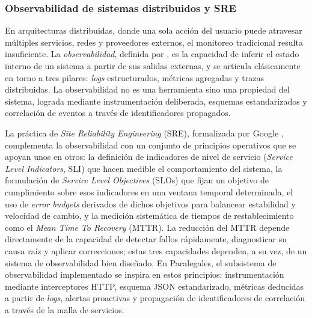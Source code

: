 \subsubsection{Observabilidad de sistemas distribuidos y SRE}

En arquitecturas distribuidas, donde una sola acción del usuario puede atravesar múltiples servicios, redes y proveedores externos, el monitoreo tradicional resulta insuficiente. La \textit{observabilidad}, definida por \textcite{Sridharan2018}, es la capacidad de inferir el estado interno de un sistema a partir de sus salidas externas, y se articula clásicamente en torno a tres pilares: \textit{logs} estructurados, métricas agregadas y trazas distribuidas. La observabilidad no es una herramienta sino una propiedad del sistema, lograda mediante instrumentación deliberada, esquemas estandarizados y correlación de eventos a través de identificadores propagados.

La práctica de \textit{Site Reliability Engineering} (SRE), formalizada por Google \cite{Beyer2016}, complementa la observabilidad con un conjunto de principios operativos que se apoyan unos en otros: la definición de indicadores de nivel de servicio (\textit{Service Level Indicators}, SLI) que hacen medible el comportamiento del sistema, la formulación de \textit{Service Level Objectives} (SLOs) que fijan un objetivo de cumplimiento sobre esos indicadores en una ventana temporal determinada, el uso de \textit{error budgets} derivados de dichos objetivos para balancear estabilidad y velocidad de cambio, y la medición sistemática de tiempos de restablecimiento como el \textit{Mean Time To Recovery} (MTTR). La reducción del MTTR depende directamente de la capacidad de detectar fallos rápidamente, diagnosticar su causa raíz y aplicar correcciones; estas tres capacidades dependen, a su vez, de un sistema de observabilidad bien diseñado. En Paralegales, el subsistema de observabilidad implementado se inspira en estos principios: instrumentación mediante interceptores HTTP, esquema JSON estandarizado, métricas deducidas a partir de \textit{logs}, alertas proactivas y propagación de identificadores de correlación a través de la malla de servicios.

